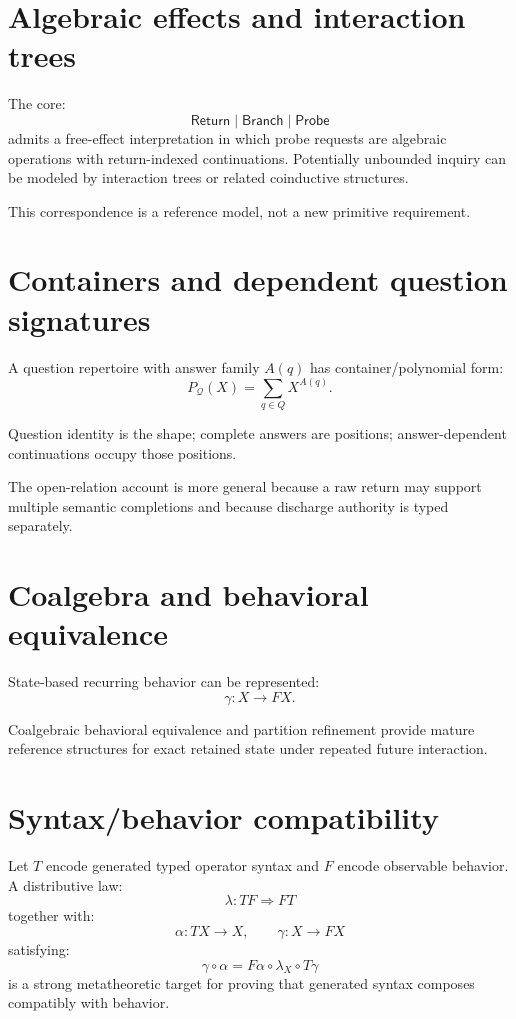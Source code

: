 \documentclass[11pt,oneside]{article}
\begin{document}
\section{Algebraic effects and interaction trees}

The core:
\[
\mathsf{Return}
\mid
\mathsf{Branch}
\mid
\mathsf{Probe}
\]
admits a free-effect interpretation in which probe requests are algebraic operations with return-indexed continuations.  Potentially unbounded inquiry can be modeled by interaction trees or related coinductive structures.

This correspondence is a reference model, not a new primitive requirement.

\section{Containers and dependent question signatures}

A question repertoire with answer family \(A(q)\) has container/polynomial form:
\[
\boxed{
P_{\mathcal Q}(X)
=
\sum_{q\in Q}X^{A(q)}.
}
\]

Question identity is the shape; complete answers are positions; answer-dependent continuations occupy those positions.

The open-relation account is more general because a raw return may support multiple semantic completions and because discharge authority is typed separately.

\section{Coalgebra and behavioral equivalence}

State-based recurring behavior can be represented:
\[
\gamma:X\to FX.
\]

Coalgebraic behavioral equivalence and partition refinement provide mature reference structures for exact retained state under repeated future interaction.

\section{Syntax/behavior compatibility}

Let \(T\) encode generated typed operator syntax and \(F\) encode observable behavior.  A distributive law:
\[
\boxed{
\lambda:TF\Rightarrow FT
}
\]
together with:
\[
\alpha:TX\to X,
\qquad
\gamma:X\to FX
\]
satisfying:
\[
\boxed{
\gamma\circ\alpha
=
F\alpha\circ\lambda_X\circ T\gamma
}
\]
is a strong metatheoretic target for proving that generated syntax composes compatibly with behavior.
\end{document}
